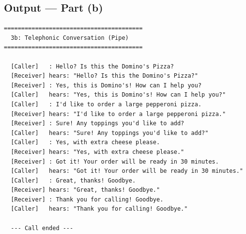 \documentclass[11pt,a4paper]{article}
\begin{document}
\subsection*{Output --- Part (b)}
\begin{outputbox}
\begin{lstlisting}[style=outputstyle]
========================================
  3b: Telephonic Conversation (Pipe)
========================================

  [Caller]   : Hello? Is this the Domino's Pizza?
  [Receiver] hears: "Hello? Is this the Domino's Pizza?"
  [Receiver] : Yes, this is Domino's! How can I help you?
  [Caller]   hears: "Yes, this is Domino's! How can I help you?"
  [Caller]   : I'd like to order a large pepperoni pizza.
  [Receiver] hears: "I'd like to order a large pepperoni pizza."
  [Receiver] : Sure! Any toppings you'd like to add?
  [Caller]   hears: "Sure! Any toppings you'd like to add?"
  [Caller]   : Yes, with extra cheese please.
  [Receiver] hears: "Yes, with extra cheese please."
  [Receiver] : Got it! Your order will be ready in 30 minutes.
  [Caller]   hears: "Got it! Your order will be ready in 30 minutes."
  [Caller]   : Great, thanks! Goodbye.
  [Receiver] hears: "Great, thanks! Goodbye."
  [Receiver] : Thank you for calling! Goodbye.
  [Caller]   hears: "Thank you for calling! Goodbye."

  --- Call ended ---
\end{lstlisting}
\end{outputbox}

\newpage
\end{document}
